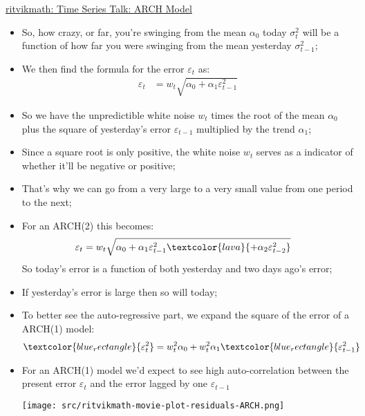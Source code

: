 \documentclass[12pt, titlepage, french]{report}
\begin{document}
\begin{YTB_SUMM}{\href{https://www.youtube.com/watch?v=Li95a2biFCU&list=PLvcbYUQ5t0UHOLnBzl46_Q6QKtFgfMGc3&index=8}{ritvikmath: Time Series Talk: ARCH Model}}
\begin{itemize}
	\item[]	So, how crazy, or far, you're swinging from the mean $\alpha_{0}$ today $\sigma^{2}_{t}$ will be a function of how far you were swinging from the mean yesterday $\sigma^{2}_{t - 1}$;
	\item	We then find the formula for the error $\varepsilon_{t}$ as:
	\begin{align*}
		\varepsilon_{t}	&=	w_{t} \sqrt{\alpha_{0} + \alpha_{1} \varepsilon_{t - 1}^{2}}
	\end{align*}
	\item[]	So we have the unpredictible white noise $w_{t}$ times the root of the mean $\alpha_{0}$ plus the square of yesterday's error $\varepsilon_{t - 1}$ multiplied by the trend $\alpha_{1}$;
	\item	Since a square root is only positive, the white noise $w_{t}$ serves as a indicator of whether it'll be negative or positive;
	\item[]	That's why we can go from a very large to a very small value from one period to the next;
	\item	For an ARCH(\textcolor{lava}{2}) this becomes:
	\begin{align*}
		\varepsilon_{t}	&=	w_{t} \sqrt{\alpha_{0} + \alpha_{1} \varepsilon_{t - 1}^{2} \textcolor{lava}{+ \alpha_{2}  \varepsilon_{t - 2}^{2}}}
	\end{align*}
	So today's error is a function of both yesterday and two days ago's error;
	\item	If yesterday's error is large then so will today;
	\item	To better see the \textcolor{blue_rectangle}{auto-regressive} part, we expand the square of the error of a ARCH(1) model:
	\begin{align*}
		\textcolor{blue_rectangle}{ \varepsilon_{t}^{2}}	&=	w_{t}^{2} \alpha_{0} + w_{t}^{2} \alpha_{1} \textcolor{blue_rectangle}{ \varepsilon_{t - 1}^{2}}
	\end{align*}
	\item	For an ARCH(1) model we'd expect to see high auto-correlation between the present error  $\varepsilon_{t}$ and the error lagged by one $\varepsilon_{t - 1}$
	
	\texttt{[image: src/ritvikmath-movie-plot-residuals-ARCH.png]}
\end{itemize}
\end{YTB_SUMM}

\end{document}
